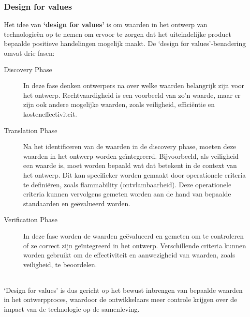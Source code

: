 \documentclass[../summary.tex]{subfiles}
\begin{document}
	\subsubsection{Design for values}
	
	Het idee van \textbf{`design for values'} is om waarden in het ontwerp van technologieën op te nemen om ervoor te zorgen dat het uiteindelijke product bepaalde positieve handelingen mogelijk maakt. De `design for values'-benadering omvat drie fasen:
	
	\begin{description}
		\item[Discovery Phase] In deze fase denken ontwerpers na over welke waarden belangrijk zijn voor het ontwerp. Rechtvaardigheid is een voorbeeld van zo'n waarde, maar er zijn ook andere mogelijke waarden, zoals veiligheid, efficiëntie en kosteneffectiviteit.
		
		\item[Translation Phase] Na het identificeren van de waarden in de discovery phase, moeten deze waarden in het ontwerp worden geïntegreerd. Bijvoorbeeld, als veiligheid een waarde is, moet worden bepaald wat dat betekent in de context van het ontwerp. Dit kan specifieker worden gemaakt door operationele criteria te definiëren, zoals flammability (ontvlambaarheid). Deze operationele criteria kunnen vervolgens gemeten worden aan de hand van bepaalde standaarden en geëvalueerd worden.
		
		\item[Verification Phase] In deze fase worden de waarden geëvalueerd en gemeten om te controleren of ze correct zijn geïntegreerd in het ontwerp. Verschillende criteria kunnen worden gebruikt om de effectiviteit en aanwezigheid van waarden, zoals veiligheid, te beoordelen.
	\end{description}
	\ \\
	`Design for values' is dus gericht op het bewust inbrengen van bepaalde waarden in het ontwerpproces, waardoor de ontwikkelaars meer controle krijgen over de impact van de technologie op de samenleving.
		
\end{document}
